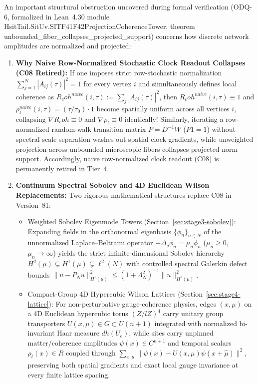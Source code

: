 \documentclass[american,11pt,letterpaper]{article}
\newcommand{\Rcoh}{R_{\mathrm{coh}}}
\def\mathbb#1{#1}%
\def\mathbf#1{#1}%
\def\mathrm#1{#1}%
\def\texttt#1{#1}%
\def\emph#1{#1}%
\def\Rcoh{R_coh}%
\begin{document}
An important structural obstruction uncovered during formal verification (\texttt{ODQ-6}, formalized in Lean~4.30 module \texttt{HsitTail.SitUv.SITF41F42ProjectionCoherenceTower}, theorem \texttt{unbounded\_fiber\_collapses\_projected\_support}) concerns how discrete network amplitudes are normalized and projected:
\begin{enumerate}[leftmargin=2em]
  \item \textbf{Why Naive Row-Normalized Stochastic Clock Readout Collapses (\texttt{C08} Retired):} If one imposes strict row-stochastic normalization $\sum_{j=1}^N |A_{ij}(\tau)|^2 = 1$ for every vertex $i$ \emph{and} simultaneously defines local coherence as $\Rcoh^{\mathrm{naive}}(i,\tau) := \sum_j |A_{ij}(\tau)|^2$, then $\Rcoh^{\mathrm{naive}}(i,\tau) \equiv 1$ and $\rho_t^{\mathrm{naive}}(i,\tau) = (\tau/\tau_0)\cdot 1$ become spatially uniform across all vertices $i$, collapsing $\nabla\Rcoh \equiv 0$ and $\nabla\rho_t \equiv 0$ identically! Similarly, iterating a row-normalized random-walk transition matrix $P = D^{-1}W$ ($P\mathbf{1} = \mathbf{1}$) without spectral scale separation washes out spatial clock gradients, while unweighted projection across unbounded microscopic fibers collapses projected norm support. Accordingly, naive row-normalized clock readout (\texttt{C08}) is permanently retired in Tier~4.
  \item \textbf{Continuum Spectral Sobolev and 4D Euclidean Wilson Replacements:} Two rigorous mathematical structures replace \texttt{C08} in Version~81:
  \begin{itemize}
    \item \emph{Weighted Sobolev Eigenmode Towers (Section~\ref{sec:stage3-sobolev}):} Expanding fields in the orthonormal eigenbasis $\{\phi_n\}_{n\in\mathbb{N}}$ of the unnormalized Laplace--Beltrami operator $-\Delta_q\phi_n = \mu_n\phi_n$ ($\mu_n \ge 0$, $\mu_n \to \infty$) yields the strict infinite-dimensional Sobolev hierarchy $H^2(\mu) \subsetneq H^1(\mu) \subsetneq \ell^2(\mathbb{N})$ with controlled spectral Galerkin defect bounds $\|u - P_N u\|_{H^1(\mu)}^2 \le (1 + \Lambda_N^2)^{-1}\|u\|_{H^2(\mu)}^2$.
    \item \emph{Compact-Group 4D Hypercubic Wilson Lattices (Section~\ref{sec:stage4-lattice}):} For non-perturbative gauge-coherence physics, edges $(x,\mu)$ on a 4D Euclidean hypercubic torus $(\mathbb{Z}/l\mathbb{Z})^4$ carry unitary group transporters $U(x,\mu) \in G \subset U(n+1)$ integrated with normalized bi-invariant Haar measure $dh(U_e)$, while sites carry unpinned matter/coherence amplitudes $\psi(x) \in \mathbb{C}^{n+1}$ and temporal scalars $\rho_t(x) \in \mathbb{R}$ coupled through $\sum_{x,\mu}\|\psi(x) - U(x,\mu)\psi(x+\hat{\mu})\|^2$, preserving both spatial gradients and exact local gauge invariance at every finite lattice spacing.
  \end{itemize}
\end{enumerate}
\end{document}

